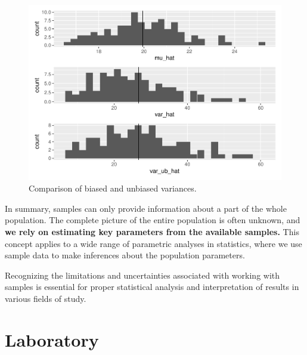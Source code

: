 \documentclass[
]{book}
\begin{document}
\begin{figure}

{\centering \includegraphics{_main_files/figure-latex/var-ub-1} 

}

\caption{Comparison of biased and unbiased variances.}\label{fig:var-ub}
\end{figure}

In summary, samples can only provide information about a part of the whole population. The complete picture of the entire population is often unknown, and \textbf{we rely on estimating key parameters from the available samples.} This concept applies to a wide range of parametric analyses in statistics, where we use sample data to make inferences about the population parameters.

Recognizing the limitations and uncertainties associated with working with samples is essential for proper statistical analysis and interpretation of results in various fields of study.

\hypertarget{laboratory-1}{%
\section{Laboratory}\label{laboratory-1}}
\end{document}
